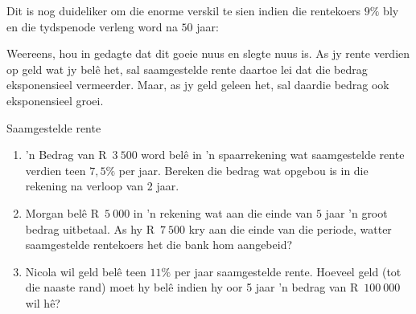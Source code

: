 Dit is nog duideliker om die enorme verskil te sien indien die rentekoers $9\%$ bly en die tydspenode verleng word na $50$ jaar:\\

\begin{figure}[H]
    \begin{center}
	\label{FG:fig:SI10}
    \end{center}
\end{figure}

Weereens, hou in gedagte dat dit goeie nuus en slegte nuus is. As jy rente verdien op geld wat jy belê het,
sal saamgestelde rente daartoe lei dat die bedrag eksponensieel vermeerder. Maar, as jy geld geleen het, sal
daardie bedrag ook eksponensieel groei.


\begin{exercises}{Saamgestelde rente}
{
    \begin{enumerate}[label=\textbf{\arabic*}.]
	\item ’n Bedrag van R~$3~500$ word belê in ’n spaarrekening wat saamgestelde rente verdien teen $7,5\%$ per jaar.
Bereken die bedrag wat opgebou is in die rekening na verloop van 2 jaar.

	\item Morgan bel\^e R~$5~000$ in 'n rekening wat aan die einde van $5$ jaar 'n groot bedrag uitbetaal. As hy R~$7~500$ kry aan die einde van die periode, watter saamgestelde rentekoers het die bank hom aangebeid?

	\item Nicola wil geld belê teen  $11\%$ per jaar saamgestelde rente. Hoeveel geld (tot die naaste rand) moet hy belê
indien hy oor 5 jaar ’n bedrag van R~$100~000$ wil hê?
    \end{enumerate}

}
\end{exercises}




